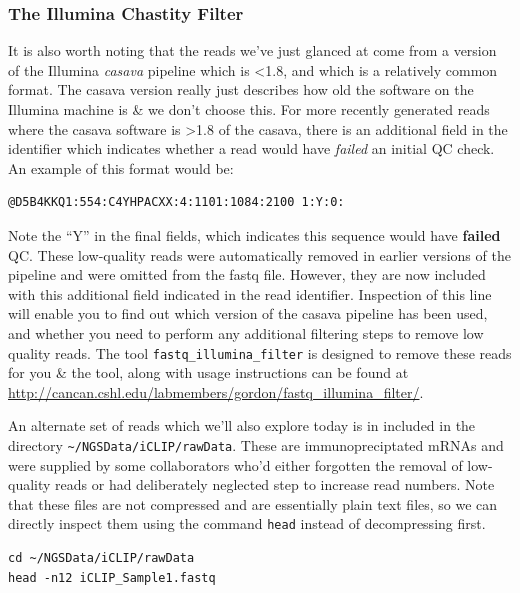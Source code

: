 \subsubsection{The Illumina Chastity Filter}
\begin{information}
It is also worth noting that the reads we've just glanced at come from a version of the Illumina \textit{casava} pipeline which is \textless 1.8, and which is a relatively common format.
The casava version really just describes how old the software on the Illumina machine is \& we don't choose this.
For more recently generated reads where the casava software is \textgreater 1.8 of the casava, there is an additional field in the identifier which indicates whether a read would have \textit{failed} an initial QC check.
An example of this format would be:
\begin{lstlisting}
@D5B4KKQ1:554:C4YHPACXX:4:1101:1084:2100 1:Y:0:
\end{lstlisting}
Note the ``Y'' in the final fields, which indicates this sequence would have \textbf{failed} QC.
These low-quality reads were automatically removed in earlier versions of the pipeline and were omitted from the fastq file.
However, they are now included with this additional field indicated in the read identifier.
Inspection of this line will enable you to find out which version of the casava pipeline has been used, and whether you need to perform any additional filtering steps to remove low quality reads.
The tool \texttt{fastq\_illumina\_filter} is designed to remove these reads for you \& the tool, along with usage instructions can be found at \url{http://cancan.cshl.edu/labmembers/gordon/fastq\_illumina\_filter/}.\\
\end{information}

\begin{steps}
An alternate set of reads which we'll also explore today is in included in the directory \texttt{\~{}/NGSData/iCLIP/rawData}.
These are immunopreciptated mRNAs and were supplied by some collaborators who'd either forgotten the removal of low-quality reads or had deliberately neglected step to increase read numbers.
Note that these files are not compressed and are essentially plain text files, so we can directly inspect them using the command \texttt{head} instead of decompressing first.\\
\end{steps}

\begin{lstlisting}
cd ~/NGSData/iCLIP/rawData
head -n12 iCLIP_Sample1.fastq
\end{lstlisting}

